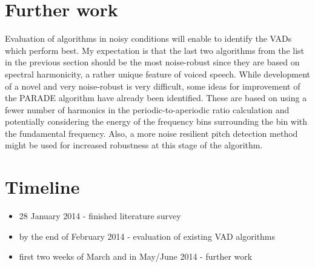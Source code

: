 
\section{Further work}

Evaluation of algorithms in noisy conditions will enable to identify the VADs which perform best. My expectation is that the last two algorithms from the list in the previous section should be the most noise-robust since they are based on spectral harmonicity, a rather unique feature of voiced speech. While development of a novel and very noise-robust is very difficult, some ideas for improvement of the PARADE \cite{PARADE} algorithm have already been identified. These are based on using a fewer number of harmonics in the periodic-to-aperiodic ratio calculation and potentially considering the energy of the frequency bins surrounding the bin with the fundamental frequency. Also, a more noise resilient pitch detection method might be used for increased robustness at this stage of the algorithm.

\section{Timeline}

\begin{itemize}
\item 28 January 2014 - finished literature survey
\item by the end of February 2014 - evaluation of existing VAD algorithms
\item first two weeks of March and in May/June 2014 - further work
\end{itemize}
